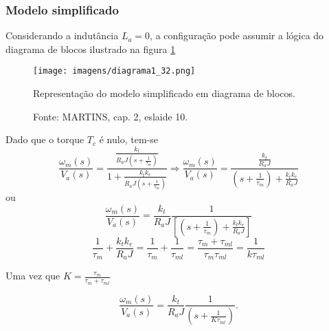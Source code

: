 \subsubsection{Modelo simplificado}

Considerando a indutância $L_{a}=0$, a configuração pode assumir a lógica do diagrama de blocos ilustrado na figura \ref{fig:D1_32} 

\begin{figure}[ht!]
\center
\texttt{[image: imagens/diagrama1\_32.png]}
\caption{\label{fig:D1_32} Representação do modelo simplificado em diagrama de blocos.}
\caption*{Fonte: MARTINS, cap. 2, eslaide 10.}
\end{figure}

Dado que o torque $T_{c}$ é nulo, tem-se \[
    \frac{\omega_{m}(s)}{V_{a}(s)} = \frac{\frac{k_{t}}{R_{a}J\left(s + \frac{1}{\tau_{m}}\right)}}{1 + \frac{k_{t}k_{e}}{R_{a}J\left(s + \frac{1}{\tau_{m}}\right)}} \Rightarrow \frac{\omega_{m}(s)}{V_{a}(s)} = \frac{\frac{k_{t}}{R_{a}J}}{\left(s + \frac{1}{\tau_{m}}\right) + \frac{k_{t}k_{e}}{R_{a}J} }
\] ou
\[\frac{\omega_{m}(s)}{V_{a}(s)} = \frac{k_{t}}{R_{a}J}\frac{1}{\left[  \left(s + \frac{1}{\tau_{m}}\right) + \frac{k_{t}k_{e}}{R_{a}J}\right] }\]
\[\frac{1}{\tau_{m}} + \frac{k_{t}k_{e}}{R_{a}J} = \frac{1}{\tau_{m}} + \frac{1}{\tau_{ml}} = \frac{\tau_{m} + \tau_{ml}}{\tau_{m}\tau_{ml}} = \frac{1}{k\tau_{ml}}\]

Uma vez que $ K = \frac{\tau_{m}}{\tau_{m} + \tau_{ml}}$ 

\[\frac{\omega_{m}(s)}{V_{a}(s)} = \frac{k_{t}}{R_{a}J}\frac{1}{\left(s + \frac{1}{K\tau_{ml}}\right)} .\]

